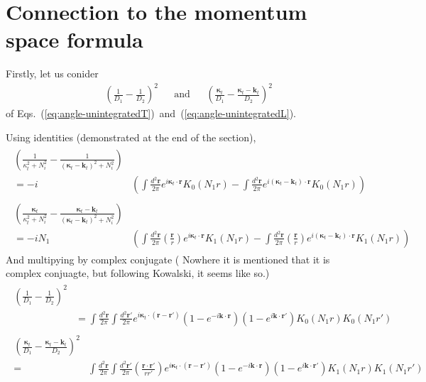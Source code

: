

\section{Connection to the momentum space formula}
Firstly, let us conider 
\begin{align}
&\left(\frac{1}{D_1}-\frac{1}{D_2}\right)^2&
&\text{and}&
&\left(\frac{\boldsymbol{\kappa}_t}{D_1}-\frac{\boldsymbol{\kappa}_t-\mathbf{k}_t}{D_2}\right)^2
\end{align}
of Eqs.~(\ref{eq:angle-unintegratedT})~and~(\ref{eq:angle-unintegratedL}).

Using identities (demonstrated at the end of the section), 
\begin{align}
\begin{split}
\left(\frac{1}{\kappa_t^2+N_i^2}-\frac{1}{(\boldsymbol{\kappa}_t-\mathbf{k}_t)^2+N_i^2} \right)&\\
=-i &\left( 
\int\frac{d^2\mathbf{r}}{2\pi}e^{i \boldsymbol{\kappa}_t\cdot\mathbf{r}}K_0(N_1 r)
- \int\frac{d^2\mathbf{r}}{2\pi}e^{i (\boldsymbol{\kappa}_t-\mathbf{k}_t)\cdot\mathbf{r}}K_0(N_1 r)
\right)
\end{split}\\
\begin{split}
\left(\frac{\boldsymbol{\kappa}_t}{\kappa_t^2+N_i^2}-\frac{\boldsymbol{\kappa}_t-\mathbf{k}_t}{(\boldsymbol{\kappa}_t-\mathbf{k}_t)^2+N_i^2} \right)&\\
=-i N_1& \left( 
\int\frac{d^2\mathbf{r}}{2\pi}\left(\frac{\mathbf{r}}{r}\right)e^{i \boldsymbol{\kappa}_t\cdot\mathbf{r}}K_1(N_1 r)
- \int\frac{d^2\mathbf{r}}{2\pi}\left(\frac{\mathbf{r}}{r}\right)e^{i (\boldsymbol{\kappa}_t-\mathbf{k}_t)\cdot\mathbf{r}}K_1(N_1 r)
\right)
\end{split}
\end{align}
And multipying by complex conjugate ({\color{red} Nowhere it is mentioned that it is complex conjuagte, but following Kowalski, it seems like so.})
\begin{align}
\begin{split}
\left(\frac{1}{D_1}-\frac{1}{D_2}\right)^2&\\
&=\int\frac{d^2\mathbf{r}}{2\pi}\int\frac{d^2\mathbf{r}'}{2\pi}
e^{i \boldsymbol{\kappa}_t\cdot(\mathbf{r}-\mathbf{r}')}
 \left(1 -e^{-i\mathbf{k}\cdot \mathbf{r}}
\right)
\left(1 -e^{i\mathbf{k}\cdot \mathbf{r}'}
\right)
K_0(N_1 r)K_0(N_1 r')
\end{split}\\
\begin{split}
\left(\frac{\boldsymbol{\kappa}_t}{D_1}-\frac{\boldsymbol{\kappa}_t-\mathbf{k}_t}{D_2}\right)^2&\\
=&\int\frac{d^2\mathbf{r}}{2\pi}\int\frac{d^2\mathbf{r}'}{2\pi}
\left(\frac{\mathbf{r}\cdot\mathbf{r}'}{r r'}\right)
e^{i \boldsymbol{\kappa}_t\cdot(\mathbf{r}-\mathbf{r}')}
 \left(1 -e^{-i\mathbf{k}\cdot \mathbf{r}}
\right)
\left(1 -e^{i\mathbf{k}\cdot \mathbf{r}'}
\right)
K_1(N_1 r)K_1(N_1 r')
\end{split}
\end{align}
